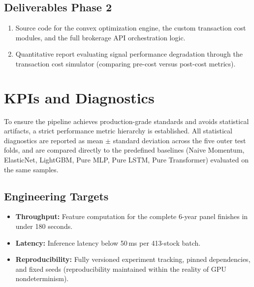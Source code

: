 \subsection*{Deliverables Phase 2}
\begin{enumerate}
    \item Source code for the convex optimization engine, the custom transaction cost modules, and the full brokerage API orchestration logic.
    \item Quantitative report evaluating signal performance degradation through the transaction cost simulator (comparing pre-cost versus post-cost metrics).
\end{enumerate}

\section{KPIs and Diagnostics}

To ensure the pipeline achieves production-grade standards and avoids statistical artifacts, a strict performance metric hierarchy is established. All statistical diagnostics are reported as mean $\pm$ standard deviation across the five outer test folds, and are compared directly to the predefined baselines (Naive Momentum, ElasticNet, LightGBM, Pure MLP, Pure LSTM, Pure Transformer) evaluated on the same samples.

\subsection*{Engineering Targets}
\begin{itemize}
    \item \textbf{Throughput:} Feature computation for the complete 6-year panel finishes in under 180 seconds.
    \item \textbf{Latency:} Inference latency below 50\,ms per 413-stock batch.
    \item \textbf{Reproducibility:} Fully versioned experiment tracking, pinned dependencies, and fixed seeds (reproducibility maintained within the reality of GPU nondeterminism).
\end{itemize}

